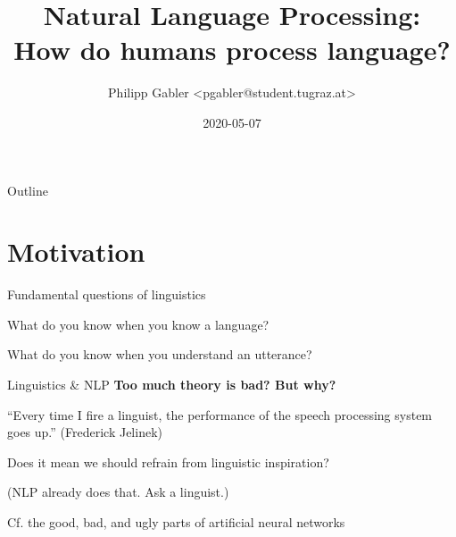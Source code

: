 \documentclass[aspectratio=169,cramped]{beamer}
\title{Natural Language Processing: \\ How do humans process language?}
\author{Philipp Gabler <pgabler@student.tugraz.at>}
\date{2020-05-07}
\let\tempone\itemize
\let\temptwo\enditemize
\renewenvironment{itemize}{\tempone\addtolength{\itemsep}{-0\baselineskip}\addtolength{\parskip}{-0.2\baselineskip}}{\temptwo}
\begin{document}
\begin{frame}
    \titlepage
\end{frame}

\begin{frame}{Outline}
    \tableofcontents
\end{frame}


\section{Motivation}

\begin{frame}{Fundamental questions of linguistics}
  \begin{itemize}
  \item What do you know when you know a language?
  \item What do you know when you understand an utterance?
  \end{itemize}
	
\end{frame}

\begin{frame}{Linguistics \& NLP}
  \textbf{Too much theory is bad? But why?}
	\begin{itemize}
  \item ``Every time I fire a linguist, the performance of the speech processing system goes up.''
    (Frederick Jelinek)
  \item Does it mean we should refrain from linguistic inspiration?
    \begin{itemize}
    \item (NLP already does that.  Ask a linguist.)
    \end{itemize}
  \item Cf. the good, bad, and ugly parts of artificial neural networks
	\end{itemize}
\end{frame}
\end{document}
